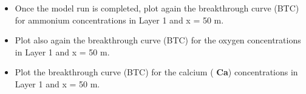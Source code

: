 \begin{itemize}

\item Once the model run is completed, plot again the breakthrough curve (BTC) for ammonium concentrations in Layer 1 and x = 50 m. 

\item Plot also again the breakthrough curve (BTC) for the oxygen concentrations in Layer 1
and x = 50 m.

\item Plot the breakthrough curve (BTC) for the calcium ({\color{red} \textbf{Ca}}) concentrations in Layer 1 and x = 50 m. 

\end{itemize}


